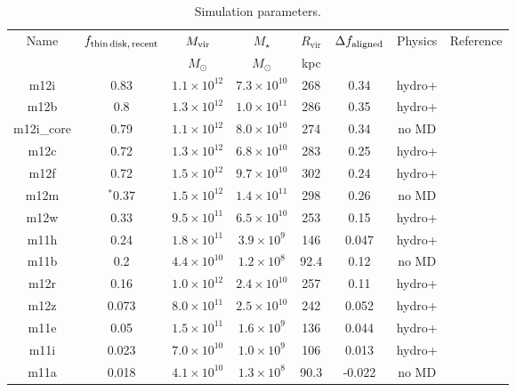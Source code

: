 \documentclass[fleqn,usenatbib]{mnras}
\begin{document}
\begin{table}
\caption{Simulation parameters.}
\begin{tabular}{cccccccc}
\hline
Name  &  $f_{\rm thin\,disk,\,recent}$  & $M_{\rm vir}$  &  $M_\star$  &  $R_{\textrm{vir}}$  &  $\Delta f_{\rm aligned}$  &  Physics  &  Reference  \\
  &   & $M_\odot$  & $M_\odot$  &  kpc  &  &  &  \\
 \hline
m12i  &  0.83  &  $1.1\times10^{12}$  &  $7.3\times10^{10}$  &  268  &  0.34  &  hydro+  &  \cite{Wetzel2016}    \\
m12b  &  0.8  &  $1.3\times10^{12}$  &  $1.0\times10^{11}$  &  286  &  0.35  &  hydro+  &  \cite{Garrison-Kimmel2019a}    \\
m12i\_core  &  0.79  &  $1.1\times10^{12}$  &  $8.0\times10^{10}$  &  274  &  0.34  &  no MD  &  \cite{Hopkins2018}    \\
m12c  &  0.72  &  $1.3\times10^{12}$  &  $6.8\times10^{10}$  &  283  &  0.25  &  hydro+  &  \cite{Garrison-Kimmel2019a}    \\
m12f  &  0.72  &  $1.5\times10^{12}$  &  $9.7\times10^{10}$  &  302  &  0.24  &  hydro+  &  \cite{Garrison-Kimmel2017}    \\
m12m  &  $^*$0.37  &  $1.5\times10^{12}$  &  $1.4\times10^{11}$  &  298  &  0.26  &  no MD  &  \cite{Hopkins2018}    \\
m12w  &  0.33  &  $9.5\times10^{11}$  &  $6.5\times10^{10}$  &  253  &  0.15  &  hydro+  &  \cite{Samuel2020}    \\
m11h  &  0.24  &  $1.8\times10^{11}$  &  $3.9\times10^{9}$  &  146  &  0.047  &  hydro+  &  \cite{El-Badry2018a}    \\
m11b  &  0.2  &  $4.4\times10^{10}$  &  $1.2\times10^{8}$  &  92.4  &  0.12  &  no MD  &  \cite{Chan2018}    \\
m12r  &  0.16  &  $1.0\times10^{12}$  &  $2.4\times10^{10}$  &  257  &  0.11  &  hydro+  &  \cite{Samuel2020}    \\
m12z  &  0.073  &  $8.0\times10^{11}$  &  $2.5\times10^{10}$  &  242  &  0.052  &  hydro+  &  \cite{Garrison-Kimmel2019a}    \\
m11e  &  0.05  &  $1.5\times10^{11}$  &  $1.6\times10^{9}$  &  136  &  0.044  &  hydro+  &  \cite{El-Badry2018a}    \\
m11i  &  0.023  &  $7.0\times10^{10}$  &  $1.0\times10^{9}$  &  106  &  0.013  &  hydro+  &  \cite{El-Badry2018a}    \\
m11a  &  0.018  &  $4.1\times10^{10}$  &  $1.3\times10^{8}$  &  90.3  &  -0.022  &  no MD  &  \cite{Chan2018}    \\

\end{tabular}
\end{table}
\end{document}
